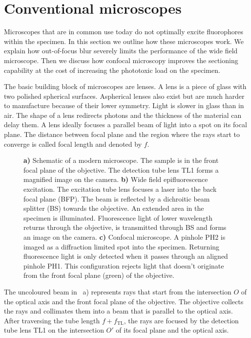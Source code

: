 \section{Conventional microscopes}
\begin{summary}
  Microscopes that are in common use today do not optimally excite
  fluorophores within the specimen. In this section we outline how
  these microscopes work. We explain how out-of-focus blur severely
  limits the performance of the wide field microscope. Then we discuss
  how confocal microscopy improves the sectioning capability at the
  cost of increasing the phototoxic load on the specimen.
\end{summary}
The basic building block of microscopes are lenses. A lens is a piece
of glass with two polished spherical surfaces. Aspherical lenses also
exist but are much harder to manufacture because of their lower
symmetry. Light is slower in glass than in air. The shape of a lens
redirects photons and the thickness of the material can delay them. A
lens ideally focuses a parallel beam of light into a spot on its focal
plane. The distance between focal plane and the region where the rays
start to converge is called focal length and denoted by $f$.
\begin{figure}[!hbt]
  \centering
  
  \caption{{\bf a)} Schematic of a modern microscope. The sample is in
    the front focal plane of the objective. The detection tube lens TL1
    forms a magnified image on the camera. {\bf b)} Wide field
    epifluorescence excitation. The excitation tube lens focuses a
    laser into the back focal plane (BFP). The beam is reflected by a
    dichroitic beam splitter (BS) towards the objective. An extended
    area in the specimen is illuminated. Fluorescence light of lower
    wavelength returns through the objective, is transmitted through
    BS and forms an image on the camera. {\bf c)} Confocal
    microscope. A pinhole PH2 is imaged as a diffraction limited spot
    into the specimen. Returning fluorescence light is only detected
    when it passes through an aligned pinhole PH1. This configuration
    rejects light that doesn't originate from the front focal plane
    (green) of the objective.}
  \label{fig:widefield-microscope}
\end{figure}

The uncoloured beam in ~a) represents
rays that start from the intersection $O$ of the optical axis and the
front focal plane of the objective. The objective collects the rays
and collimates them into a beam that is parallel to the optical
axis. After traversing the tube length $f+f_\textrm{TL}$, the rays are
focused by the detection tube lens TL1 on the intersection $O'$ of its
focal plane and the optical axis. 

